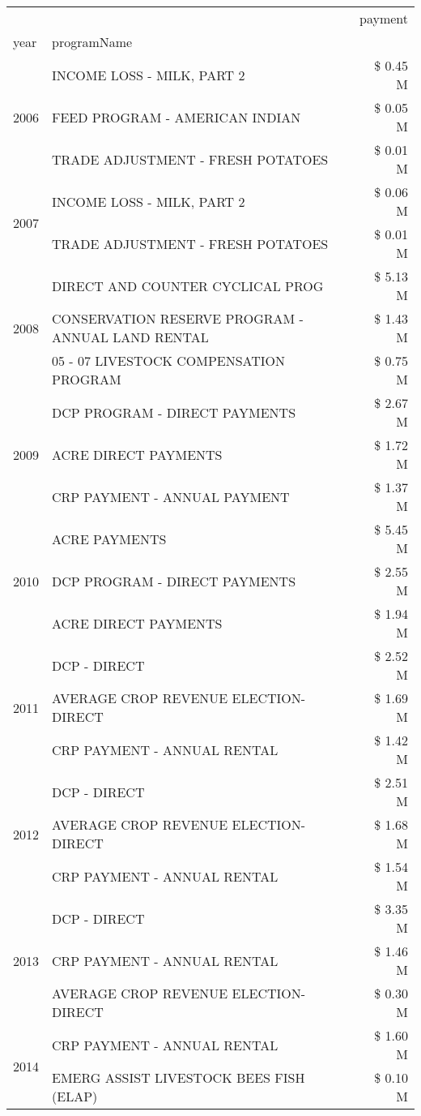 \begin{tabular}{llr}
\toprule
 &  & payment \\
year & programName &  \\
\midrule
\multirow[t]{3}{*}{2006} & INCOME LOSS - MILK, PART 2 & \$ 0.45 M \\
 & FEED PROGRAM - AMERICAN INDIAN & \$ 0.05 M \\
 & TRADE ADJUSTMENT - FRESH POTATOES & \$ 0.01 M \\
\cline{1-3}
\multirow[t]{2}{*}{2007} & INCOME LOSS - MILK, PART 2 & \$ 0.06 M \\
 & TRADE ADJUSTMENT - FRESH POTATOES & \$ 0.01 M \\
\cline{1-3}
\multirow[t]{3}{*}{2008} & DIRECT AND COUNTER CYCLICAL PROG & \$ 5.13 M \\
 & CONSERVATION RESERVE PROGRAM - ANNUAL LAND RENTAL & \$ 1.43 M \\
 & 05 - 07 LIVESTOCK COMPENSATION PROGRAM & \$ 0.75 M \\
\cline{1-3}
\multirow[t]{3}{*}{2009} & DCP PROGRAM - DIRECT PAYMENTS & \$ 2.67 M \\
 & ACRE DIRECT PAYMENTS & \$ 1.72 M \\
 & CRP PAYMENT - ANNUAL PAYMENT & \$ 1.37 M \\
\cline{1-3}
\multirow[t]{3}{*}{2010} & ACRE PAYMENTS & \$ 5.45 M \\
 & DCP PROGRAM - DIRECT PAYMENTS & \$ 2.55 M \\
 & ACRE DIRECT PAYMENTS & \$ 1.94 M \\
\cline{1-3}
\multirow[t]{3}{*}{2011} & DCP - DIRECT & \$ 2.52 M \\
 & AVERAGE CROP REVENUE ELECTION-DIRECT & \$ 1.69 M \\
 & CRP PAYMENT - ANNUAL RENTAL & \$ 1.42 M \\
\cline{1-3}
\multirow[t]{3}{*}{2012} & DCP - DIRECT & \$ 2.51 M \\
 & AVERAGE CROP REVENUE ELECTION-DIRECT & \$ 1.68 M \\
 & CRP PAYMENT - ANNUAL RENTAL & \$ 1.54 M \\
\cline{1-3}
\multirow[t]{3}{*}{2013} & DCP - DIRECT & \$ 3.35 M \\
 & CRP PAYMENT - ANNUAL RENTAL & \$ 1.46 M \\
 & AVERAGE CROP REVENUE ELECTION-DIRECT & \$ 0.30 M \\
\cline{1-3}
\multirow[t]{3}{*}{2014} & CRP PAYMENT - ANNUAL RENTAL & \$ 1.60 M \\
 & EMERG ASSIST LIVESTOCK BEES FISH (ELAP) & \$ 0.10 M \\

\end{tabular}
